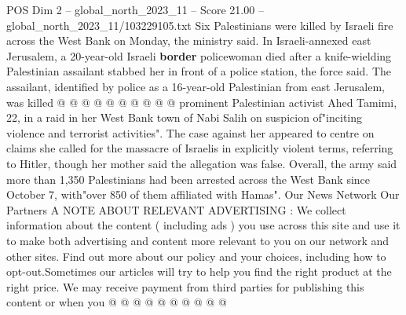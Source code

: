 \begin{textsample}{POS Dim 2 – global\_north\_2023\_11 – Score 21.00 – global\_north\_2023\_11/103229105.txt}
Six Palestinians were killed by Israeli fire across the West Bank on Monday, the ministry said.
In Israeli-annexed east Jerusalem, a 20-year-old Israeli \textbf{border} policewoman died after a knife-wielding Palestinian assailant stabbed her in front of a police station, the force said.
The assailant, identified by police as a 16-year-old Palestinian from east Jerusalem, was killed @ @ @ @ @ @ @ @ @ @ prominent Palestinian activist Ahed Tamimi, 22, in a raid in her West Bank town of Nabi Salih on suspicion of"inciting violence and terrorist activities".
The case against her appeared to centre on claims she called for the massacre of Israelis in explicitly violent terms, referring to Hitler, though her mother said the allegation was false.
Overall, the army said more than 1,350 Palestinians had been arrested across the West Bank since October 7, with"over 850 of them affiliated with Hamas".
Our News Network Our Partners A NOTE ABOUT RELEVANT ADVERTISING : We collect information about the content ( including ads ) you use across this site and use it to make both advertising and content more relevant to you on our network and other sites.
Find out more about our policy and your choices, including how to opt-out.Sometimes our articles will try to help you find the right product at the right price.
We may receive payment from third parties for publishing this content or when you @ @ @ @ @ @ @ @ @ @

\end{textsample}
